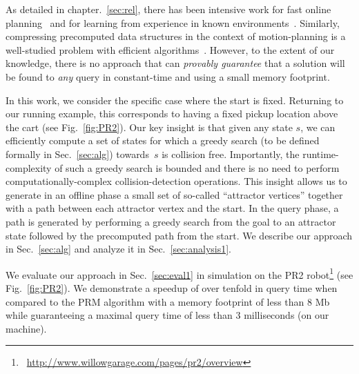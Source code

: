 \documentclass[a4paper]{report}
\begin{document}
As detailed in chapter.~\ref{sec:rel}, there has been intensive work 
for fast online planning~\cite{LA18} and 
for learning from experience in known environments~\cite{PCCL12,PDCL13,berenson2012robot,CSMOC15}.
Similarly, compressing precomputed data structures in the context of motion-planning is a well-studied problem with efficient algorithms~\cite{SSAH14,DB14}.
However, to the extent of our knowledge, there is no approach that can \emph{provably guarantee} that a solution will be found to \emph{any} query in constant-time and using a small memory footprint.


In this work, we consider the specific case where the start is fixed. Returning to our running example, this corresponds to having a fixed pickup location above the cart (see Fig.~\ref{fig:PR2}).
%
Our key insight is that given any state $s$, we can efficiently compute a set of states for which a greedy search (to be defined formally in Sec.~\ref{sec:alg}) towards~$s$ is collision free.
Importantly, the runtime-complexity of such a greedy search is bounded and there is no need to perform computationally-complex collision-detection operations. 
This insight allows us to generate in an offline phase a small set of so-called ``attractor vertices'' together with a path between each attractor vertex and the start.
In the query phase, a path is generated by performing a greedy search from the goal to an attractor state followed by the precomputed path from the start.
We describe our approach in Sec.~\ref{sec:alg} and analyze it in Sec.~\ref{sec:analysis1}.


We evaluate our approach in Sec.~\ref{sec:eval1} in simulation on the PR2 robot\footnote{~\url{http://www.willowgarage.com/pages/pr2/overview}} (see Fig.~\ref{fig:PR2}).
We demonstrate a speedup of over tenfold in query time when compared to the PRM algorithm with a memory footprint of less than 8 Mb while guaranteeing a maximal query time of less than 3 milliseconds (on our machine).

\end{document}

